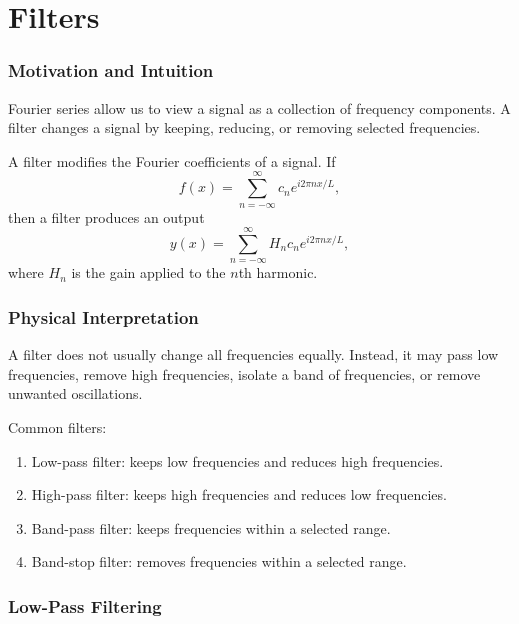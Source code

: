 \section{Filters}

\subsubsection*{Motivation and Intuition}

Fourier series allow us to view a signal as a collection of frequency components. A filter changes a signal by keeping, reducing, or removing selected frequencies.

\begin{conceptbox}
    A filter modifies the Fourier coefficients of a signal. If
    \[
        f(x)=\sum_{n=-\infty}^{\infty}
        c_n e^{i2\pi nx/L},
    \]
    then a filter produces an output
    \[
        y(x)=\sum_{n=-\infty}^{\infty}
        H_n c_n e^{i2\pi nx/L},
    \]
    where $H_n$ is the gain applied to the $n$th harmonic.
\end{conceptbox}

\subsubsection*{Physical Interpretation}

A filter does not usually change all frequencies equally. Instead, it may pass low frequencies, remove high frequencies, isolate a band of frequencies, or remove unwanted oscillations.

\begin{conceptbox}
    Common filters:
    \begin{enumerate}
        \item Low-pass filter: keeps low frequencies and reduces high frequencies.
        \item High-pass filter: keeps high frequencies and reduces low frequencies.
        \item Band-pass filter: keeps frequencies within a selected range.
        \item Band-stop filter: removes frequencies within a selected range.
    \end{enumerate}
\end{conceptbox}

\subsubsection*{Low-Pass Filtering}

